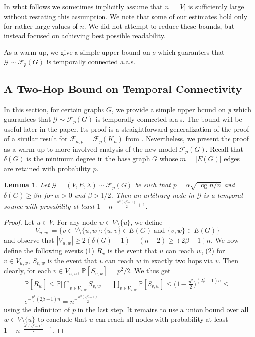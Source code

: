 \documentclass[a4paper,11pt]{article}
\makeatletter
\theoremstyle{definition}
\theoremstyle{plain}
\newtheorem{lemma}{Lemma}
\newcommand{\FFF}{\mathcal{F}}
\newcommand{\GGG}{\mathcal{G}}
\newcommand{\G}{\mathcal G}
\newcommand{\F}{\mathcal F}
\newcommand{\prob}{\mathbb{P}}
\renewcommand{\Pr}{\prob}
\newcommand{\aas}{a.a.s.\@\xspace}
\makeatother
\begin{document}
In what follows we sometimes implicitly assume that $n=|V|$ is sufficiently large without restating this assumption. We note that some of our estimates hold only for rather large values of $n$. We did not attempt to reduce these bounds, but instead focused on achieving best possible readability.

As a warm-up, we give a simple upper bound on $p$ which guarantees that $\G \sim \F_p(G)$ is temporally connected \aas

\subsection{A Two-Hop Bound on Temporal Connectivity}\label{app:twohop}
In this section, for certain graphs $G$, we provide a simple upper bound on $p$ which guarantees that $\G \sim \F_p(G)$ is temporally connected \aas The bound will be useful later in the paper. Its proof is a straightforward generalization of the proof of a similar result for $\F_{n,p} = \F_p(K_n)$ from \cite{CasteigtsRRZ21}. Nevertheless, we present the proof as a warm up to more involved analysis of the new model $\F_p(G)$. Recall that $\delta(G)$ is the minimum degree in the base graph $G$ whose $m=|E(G)|$ edges are retained with probability $p$.

\begin{lemma}\label{lem: two hops}
	Let $\GGG=(V, E, \lambda)\sim\FFF_{p}(G)$ be such that $p= \alpha \sqrt{\log n/n}$ and $\delta(G)\ge \beta n$ for $\alpha >0$ and $\beta >1/2$. Then an arbitrary node in $\GGG$ is a temporal source with probability at least $1 - n^{-\frac{\alpha^2(2\beta -1)}{2} + 1}$.
\end{lemma}
\begin{proof}
	Let $u\in V$. For any node $w\in V\setminus \{u\}$, we define
	\[
		V_{u,w}:=\{v\in V\setminus\{u,w\}: \{u,v\}\in E(G) \text{ and } \{v,w\}\in E(G)\}
	\]
	and observe that $|V_{u,w}|\ge 2(\delta(G) -1) - (n-2)\ge (2\beta -1)n$. We now define the following events (1) $R_w$ is the event that $u$ can reach $w$, (2) for $v\in V_{u,w}$, $S_{v,w}$ is the event that $u$ can reach $w$ in exactly two hops via $v$. Then clearly, for each $v\in V_{u,w}$, $\Pr[S_{v,w}]=p^2/2$.
	We thus get
	\begin{align*}
		\Pr[\overline{R_w}]
		\le \Pr\Big[\bigcap_{v\in V_{u,w}} \overline{S_{v,w}}\Big]
		= \prod_{v\in V_{u,w}} \Pr [ \overline{S_{v,w}} ]
		\le \Big(1 - \frac{p^2}{2}\Big)^{(2\beta -1)n}
		\le \\ e^{- \frac{p^2}{2}(2\beta -1)n}
		= n^{- \frac{\alpha^2(2\beta -1)}{2}}
	\end{align*}
	using the definition of $p$ in the last step.
	It remains to use a union bound over all  $w\in V\setminus \{u\}$ to conclude that $u$ can reach all nodes with probability at least $1 - n^{- \frac{\alpha^2(2\beta -1)}{2} + 1}$.
\end{proof}
\end{document}
